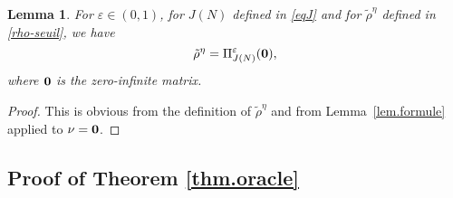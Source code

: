 \documentclass[a4paper]{amsart}
\newtheorem{lemma}{Lemma}[section]
\begin{document}
\begin{lemma}
         \label{lem.estimator}
         For $\varepsilon\in(0,1)$,  for $J(N)$ defined in \eqref{eqJ} and for
$\tilde{\rho}^{\eta}$ defined in \eqref{rho-seuil}, we have
          $$
          \tilde{\rho}^\eta = \Pi_{J(N)}^{\varepsilon}({\bf 0}),
          $$
          where ${\bf 0}$ is the zero-infinite matrix.
\end{lemma}

\begin{proof}
         This is obvious from the definition of $\tilde{\rho}^\eta$ and from
Lemma~\ref{lem.formule} applied to $\nu={\bf 0}$.
\end{proof}




\subsection{Proof of Theorem \ref{thm.oracle}}
\noindent\\
\end{document}
